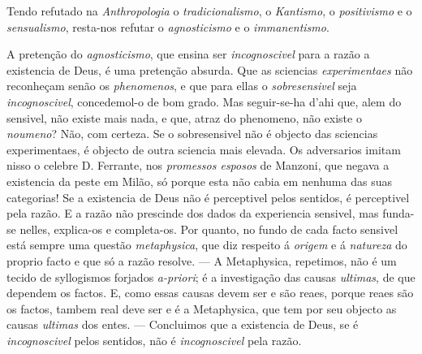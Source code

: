 {Tendo refutado na \emph{Anthropologia} o \emph{tradicionalismo}, o \emph{Kantismo}, o
\emph{positivismo} e o \emph{sensualismo}, resta-nos refutar o \emph{agnosticismo} e o
\emph{immanentismo}.

A pretenção do \emph{agnosticismo}, que ensina ser \emph{incognoscivel} para a razão a
existencia de Deus, é uma pretenção absurda. Que as sciencias \emph{experimentaes} não
reconheçam senão os \emph{phenomenos}, e que para ellas o \emph{sobresensivel} seja
\emph{incognoscivel}, concedemol-o de bom grado. Mas seguir-se-ha d'ahi que, alem do
sensivel, não existe mais nada, e que, atraz do phenomeno, não existe o \emph{noumeno}?
Não, com certeza. Se o sobresensivel não é objecto das sciencias experimentaes, é
objecto de outra sciencia mais elevada. Os adversarios imitam nisso o celebre D.
Ferrante, nos \emph{promessos esposos} de Manzoni, que negava a existencia da peste em
Milão, só porque esta não cabia em nenhuma das suas categorias! Se a existencia de Deus
não é perceptivel pelos
sentidos, é perceptivel pela razão. E a razão não prescinde dos dados da experiencia
sensivel, mas funda-se nelles, explica-os e completa-os. Por quanto, no fundo de cada
facto sensivel está sempre uma questão \emph{metaphysica}, que diz respeito á
\emph{origem} e á \emph{natureza} do proprio facto e que só a razão resolve. --- A
Metaphysica, repetimos, não é um tecido de syllogismos forjados \emph{a-priori}; é a
investigação das causas \emph{ultimas}, de que dependem os factos. E, como essas
causas devem ser e são reaes, porque reaes são os factos, tambem real deve ser e é a
Metaphysica, que tem por seu objecto as causas \emph{ultimas} dos entes. --- Concluimos
que a existencia de Deus, se é \emph{incognoscivel} pelos sentidos, não é
\emph{incognoscivel} pela razão.

}
